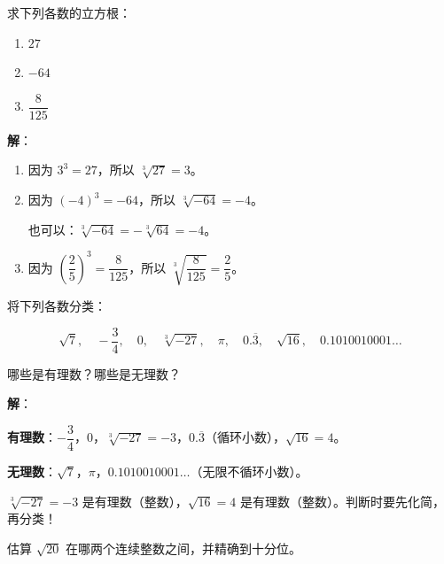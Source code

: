 \documentclass[12pt, a4paper]{ctexart}
\begin{document}
\vspace{6pt}

\begin{examplebox}[【例题2】求立方根]
求下列各数的立方根：
\begin{enumerate}[label=(\arabic*)]
  \item $27$
  \item $-64$
  \item $\dfrac{8}{125}$
\end{enumerate}
\end{examplebox}

\textbf{解}：

\begin{enumerate}[label=(\arabic*)]
  \item 因为 $3^3 = 27$，所以 $\sqrt[3]{27} = 3$。

  \item 因为 $(-4)^3 = -64$，所以 $\sqrt[3]{-64} = -4$。

  也可以：$\sqrt[3]{-64} = -\sqrt[3]{64} = -4$。

  \item 因为 $\left(\dfrac{2}{5}\right)^3 = \dfrac{8}{125}$，所以 $\sqrt[3]{\dfrac{8}{125}} = \dfrac{2}{5}$。
\end{enumerate}

\vspace{6pt}

\begin{examplebox}[【例题3】判断有理数与无理数]
将下列各数分类：

\[
\sqrt{7},\quad -\frac{3}{4},\quad 0,\quad \sqrt[3]{-27},\quad \pi,\quad 0.\overline{3},\quad \sqrt{16},\quad 0.1010010001\ldots
\]

哪些是有理数？哪些是无理数？
\end{examplebox}

\textbf{解}：

\textbf{有理数}：$-\dfrac{3}{4}$，$0$，$\sqrt[3]{-27} = -3$，$0.\overline{3}$（循环小数），$\sqrt{16} = 4$。

\textbf{无理数}：$\sqrt{7}$，$\pi$，$0.1010010001\ldots$（无限不循环小数）。

\begin{warnbox}[易错提醒]
$\sqrt[3]{-27} = -3$ 是有理数（整数），$\sqrt{16} = 4$ 是有理数（整数）。判断时要先化简，再分类！
\end{warnbox}

\vspace{6pt}

\begin{examplebox}[【例题4】估算无理数的大小]
估算 $\sqrt{20}$ 在哪两个连续整数之间，并精确到十分位。
\end{examplebox}
\end{document}
